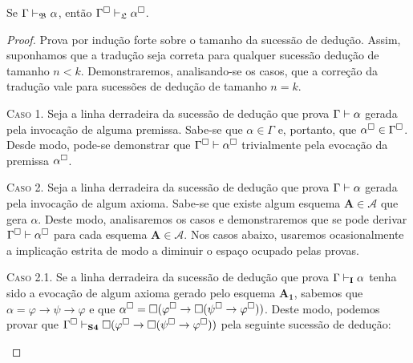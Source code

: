     \begin{tcolorbox}[enhanced jigsaw, breakable, sharp corners, colframe=black, colback=white, boxrule=0.5pt, left=1.5mm, right=1.5mm, top=1.5mm, bottom=1.5mm]
    \begin{theorem}\label{square.soundness}
        Se $\Gamma\mathrel{\vdash}_\mathfrak{B}\alpha$, então $\Gamma^\Box\mathrel{\vdash}_\mathfrak{L}\alpha^\Box$.
    \end{theorem}

    \begin{proof}
        Prova por indução forte sobre o tamanho da sucessão de dedução.
        Assim, suponhamos que a tradução seja correta para qualquer sucessão dedução de tamanho $n < k$.
        Demonstraremos, analisando-se os casos, que a correção da tradução vale para sucessões de dedução de tamanho $n = k$.

        \begin{case}
            \textsc{Caso 1.}
            Seja a linha derradeira da sucessão de dedução que prova $\Gamma\mathrel{\vdash}\alpha$ gerada pela invocação de alguma premissa.
            Sabe-se que $\alpha\in\Gamma$ e, portanto, que $\alpha^\Box\in\Gamma^\Box$.
            Desde modo, pode-se demonstrar que $\Gamma^\Box\mathrel{\vdash}\alpha^\Box$ trivialmente pela evocação da premissa $\alpha^\Box$.
        \end{case}

        \begin{case}
            \textsc{Caso 2.}
            Seja a linha derradeira da sucessão de dedução que prova $\Gamma\mathrel{\vdash}\alpha$ gerada pela invocação de algum axioma.
            Sabe-se que existe algum esquema $\mathbf{A}\in\mathcal{A}$ que gera $\alpha$. 
            Deste modo, analisaremos os casos e demonstraremos que se pode derivar $\Gamma^\Box\mathrel{\vdash}\alpha^\Box$ para cada esquema $\mathbf{A}\in\mathcal{A}$.
            Nos casos abaixo, usaremos ocasionalmente a implicação estrita de modo a diminuir o espaço ocupado pelas provas.
        \end{case}

            \begin{subcase}
                \textsc{Caso 2.1.} Se a linha derradeira da sucessão de dedução que prova $\Gamma\mathrel{\vdash}_\mathbf{I}\alpha$ tenha sido a evocação de algum axioma gerado pelo esquema $\hyperref[IA1]{\mathbf{A_1}}$, sabemos que $\alpha=\varphi\to\psi\to\varphi$ e que $\alpha^\Box=\Box(\varphi^\Box\to\Box(\psi^\Box\to\varphi^\Box))$. Deste modo, podemos provar que $\Gamma^\Box\mathrel{\vdash}_\mathbf{S4}\Box(\varphi^\Box\to\Box(\psi^\Box\to\varphi^\Box))$ pela seguinte sucessão de dedução:


\end{subcase}
\end{proof}
\end{tcolorbox}
